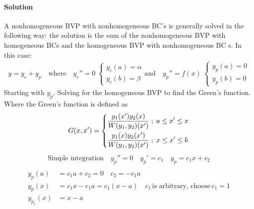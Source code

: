 \documentclass{article}
\begin{document}
{\begin{enumerate}
		\paragraph{Solution} A nonhomogeneous BVP with nonhomogeneous BC's is generally solved in the following way: the solution is the sum of the nonhomogeneous BVP with homogeneous BCs and the homogeneous BVP with nonhomogeneous BC s. In this case:
		\begin{equation*}
			\begin{split}
				y = y_c + y_p \quad
				\text{where} \quad
				y_c'' = 0 \;
				\begin{cases}
					y_c(a) = \alpha \\
					y_c(b) = \beta
				\end{cases}
				\text{and} \quad
				y_p'' = f(x) \;
				\begin{cases}
					y_p(a) = 0 \\
					y_p(b) = 0 
				\end{cases}
			\end{split}
		\end{equation*}
		Starting with $y_p$. Solving for the homogeneous BVP to find the Green's function. Where the Green's function is defined as
		\begin{equation*}
			\begin{split}
				G(x,x') =
				\begin{dcases}
					\frac{y_1 (x') y_2 (x)}{W(y_1 , y_2)(x')} \; ; \; a \leq x' \leq x \\
					\frac{y_1 (x) y_2 (x')}{W(y_1 , y_2)(x')} \; ; \; x \leq x' \leq b
				\end{dcases}
			\end{split}
		\end{equation*}
		\begin{equation*}
			\begin{split}
				\text{Simple integration} \quad y_p'' = 0 \quad y_p' = c_1 \quad y_p = c_1 x + c_2 \\
			\end{split}
		\end{equation*}
		\begin{equation*}
			\begin{split}
				y_p(a) &= c_1 a + c_2 = 0 \quad c_2 = -c_1 a \\
				y_p(x) &= c_1 x - c_1 a = c_1(x-a) \quad c_1 \, \text{is arbitrary, choose} \, c_1 = 1 \\
				y_{p_1}(x) &= x - a \\
			\end{split}

\end{equation*}
\end{enumerate}}
\end{document}
